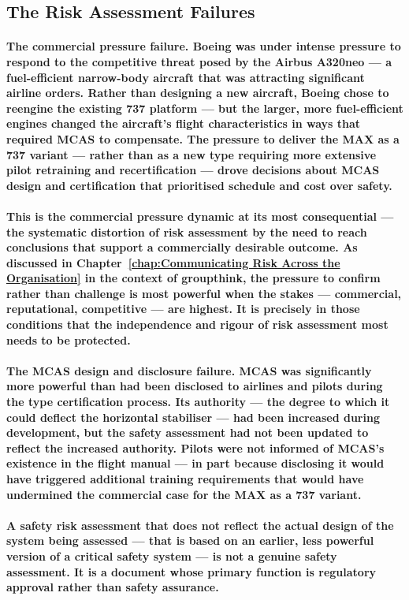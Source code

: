 \subsection{The Risk Assessment Failures}
\paragraph{\textbf{The commercial pressure failure}. Boeing was under intense pressure to respond to the competitive threat posed by the Airbus A320neo — a fuel-efficient narrow-body aircraft that was attracting significant airline orders. Rather than designing a new aircraft, Boeing chose to reengine the existing 737 platform — but the larger, more fuel-efficient engines changed the aircraft's flight characteristics in ways that required MCAS to compensate. The pressure to deliver the MAX as a 737 variant — rather than as a new type requiring more extensive pilot retraining and recertification — drove decisions about MCAS design and certification that prioritised schedule and cost over safety.}
\paragraph{This is the commercial pressure dynamic at its most consequential — the systematic distortion of risk assessment by the need to reach conclusions that support a commercially desirable outcome. As discussed in Chapter~\ref{chap:Communicating Risk Across the Organisation} in the context of groupthink, the pressure to confirm rather than challenge is most powerful when the stakes — commercial, reputational, competitive — are highest. It is precisely in those conditions that the independence and rigour of risk assessment most needs to be protected.}
\paragraph{\textbf{The MCAS design and disclosure failure}. MCAS was significantly more powerful than had been disclosed to airlines and pilots during the type certification process. Its authority — the degree to which it could deflect the horizontal stabiliser — had been increased during development, but the safety assessment had not been updated to reflect the increased authority. Pilots were not informed of MCAS's existence in the flight manual — in part because disclosing it would have triggered additional training requirements that would have undermined the commercial case for the MAX as a 737 variant.}
\paragraph{A safety risk assessment that does not reflect the actual design of the system being assessed — that is based on an earlier, less powerful version of a critical safety system — is not a genuine safety assessment. It is a document whose primary function is regulatory approval rather than safety assurance.}
